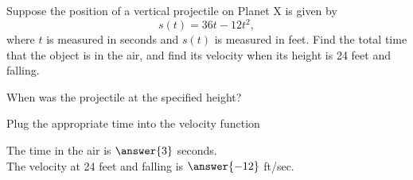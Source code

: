 \documentclass{ximera}
\begin{document}
\begin{problem}
Suppose the position of a vertical projectile on Planet X is given by 
\[s(t) = 36t - 12t^2, \]
where $t$ is measured in seconds and $s(t)$ is measured in feet. 
Find the total time that the object is in the air, and find its velocity when its height is 24 feet and falling.
\begin{hint}
When was the projectile at the specified height?
\end{hint}
\begin{hint}
Plug the appropriate time into the velocity function
\end{hint}

The time in the air is $\answer{3}$ seconds.\\
The velocity at 24 feet and falling is $\answer{-12}$ ft/sec.

\end{problem}


\end{document}

